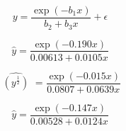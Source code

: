 \documentclass[12pt]{article}
\begin{document}
\pagestyle{empty}
\Large
{}
\pagecolor{ehandbook}

\boldmath
\[
y = \frac{\exp(-b_1 x)} {b_2 + b_3 x} + \epsilon
\]

\hspace*{.5in}

\[
\hat{y} = \frac{\exp(-0.190x)} {0.00613 + 0.0105x}
\]

\hspace*{.5in}

\[
\widehat{\,\, \left(y^{\frac{1}{2}}\right) \,\,} = \frac{\exp(-0.015x)} {0.0807 + 0.0639x}
\]

\[
\hat{y} = \frac{\exp(-0.147x)}{0.00528 + 0.0124x}
\]
\end{document}

